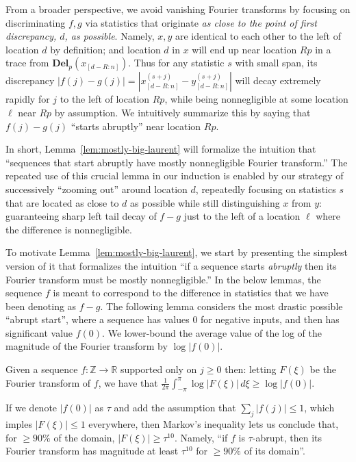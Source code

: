 \documentclass[11pt]{article}
\theoremstyle{plain}
\newcommand{\Del}[2]{\textbf{Del}_{#1}(#2)}
\begin{document}
From a broader perspective, we avoid vanishing Fourier transforms by focusing on discriminating $f,g$ via statistics that originate \emph{as close to the point of first discrepancy, $d$, as possible}. Namely, $x,y$ are identical to each other to the left of location $d$ by definition; and location $d$ in $x$ will end up near location $Rp$ in a trace from $\Del{p}{x_{[d-R:n]}}$. Thus for any statistic $s$ with small span, its discrepancy $|f(j)-g(j)|=\left|x^{(s+j)}_{[d-R:n]}-y^{(s+j)}_{[d-R:n]}\right|$ will decay extremely rapidly for $j$ to the left of location $Rp$, while being nonnegligible at some location $\ell$ near $Rp$ by assumption. We intuitively summarize this by saying that $f(j)-g(j)$ ``starts abruptly'' near location $Rp$.

In short, Lemma~\ref{lem:mostly-big-laurent} will formalize the intuition that ``sequences that start abruptly have mostly nonnegligible Fourier transform.'' The repeated use of this crucial lemma in our induction is enabled by our strategy of successively ``zooming out'' around location $d$, repeatedly focusing on statistics $s$ that are located as close to $d$ as possible while still distinguishing $x$ from $y$: guaranteeing sharp left tail decay of $f-g$ just to the left of a location $\ell$ where the difference is nonnegligible.

To motivate Lemma~\ref{lem:mostly-big-laurent}, we start by presenting the simplest version of it that formalizes the intuition ``if a sequence starts \emph{abruptly} then its Fourier transform must be mostly nonnegligible.'' In the below lemmas, the sequence $f$ is meant to correspond to the difference in statistics that we have been denoting as $f-g$. The following lemma considers the most drastic possible ``abrupt start'', where a sequence has values 0 for negative inputs, and then has significant value $f(0)$. We lower-bound the average value of the log of the magnitude of the Fourier transform by $\log|f(0)|$.

\begin{lemma}\label{lem:mostly-big}
Given a sequence $f:\mathbb{Z}\rightarrow\mathbb{R}$ supported only on $j\geq 0$ then: letting $F(\xi)$ be the Fourier transform of $f$, we have that $\frac{1}{2\pi}\int_{-\pi}^{\pi}\log|F(\xi)|\,d\xi\geq \log|f(0)|$.
\end{lemma}

If we denote $|f(0)|$ as $\tau$ and add the assumption that $\sum_j |f(j)|\leq 1$, which imples $|F(\xi)|\leq 1$ everywhere, then Markov's inequality lets us conclude that, for $\geq 90\%$ of the domain, $|F(\xi)|\geq \tau^{10}$. Namely, ``if $f$ is $\tau$-abrupt, then its Fourier transform has magnitude at least $\tau^{10}$ for $\geq 90\%$ of its domain''.
\end{document}
